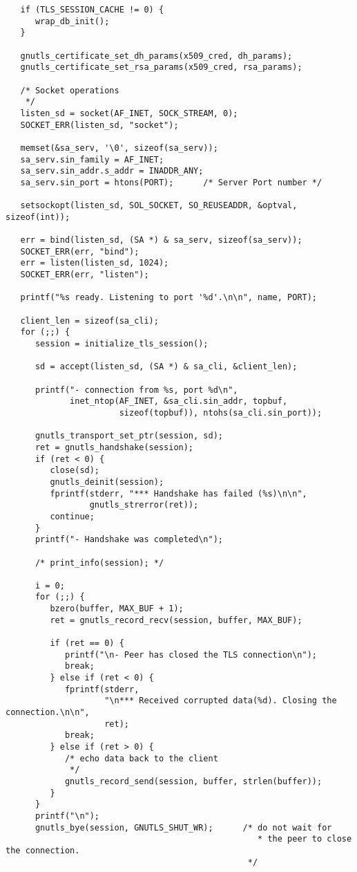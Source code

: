 \begin{verbatim}
   if (TLS_SESSION_CACHE != 0) {
      wrap_db_init();
   }

   gnutls_certificate_set_dh_params(x509_cred, dh_params);
   gnutls_certificate_set_rsa_params(x509_cred, rsa_params);

   /* Socket operations
    */
   listen_sd = socket(AF_INET, SOCK_STREAM, 0);
   SOCKET_ERR(listen_sd, "socket");

   memset(&sa_serv, '\0', sizeof(sa_serv));
   sa_serv.sin_family = AF_INET;
   sa_serv.sin_addr.s_addr = INADDR_ANY;
   sa_serv.sin_port = htons(PORT);      /* Server Port number */

   setsockopt(listen_sd, SOL_SOCKET, SO_REUSEADDR, &optval, sizeof(int));

   err = bind(listen_sd, (SA *) & sa_serv, sizeof(sa_serv));
   SOCKET_ERR(err, "bind");
   err = listen(listen_sd, 1024);
   SOCKET_ERR(err, "listen");

   printf("%s ready. Listening to port '%d'.\n\n", name, PORT);

   client_len = sizeof(sa_cli);
   for (;;) {
      session = initialize_tls_session();

      sd = accept(listen_sd, (SA *) & sa_cli, &client_len);

      printf("- connection from %s, port %d\n",
             inet_ntop(AF_INET, &sa_cli.sin_addr, topbuf,
                       sizeof(topbuf)), ntohs(sa_cli.sin_port));

      gnutls_transport_set_ptr(session, sd);
      ret = gnutls_handshake(session);
      if (ret < 0) {
         close(sd);
         gnutls_deinit(session);
         fprintf(stderr, "*** Handshake has failed (%s)\n\n",
                 gnutls_strerror(ret));
         continue;
      }
      printf("- Handshake was completed\n");

      /* print_info(session); */

      i = 0;
      for (;;) {
         bzero(buffer, MAX_BUF + 1);
         ret = gnutls_record_recv(session, buffer, MAX_BUF);

         if (ret == 0) {
            printf("\n- Peer has closed the TLS connection\n");
            break;
         } else if (ret < 0) {
            fprintf(stderr,
                    "\n*** Received corrupted data(%d). Closing the connection.\n\n",
                    ret);
            break;
         } else if (ret > 0) {
            /* echo data back to the client
             */
            gnutls_record_send(session, buffer, strlen(buffer));
         }
      }
      printf("\n");
      gnutls_bye(session, GNUTLS_SHUT_WR);      /* do not wait for
                                                   * the peer to close the connection.
                                                 */


\end{verbatim}
